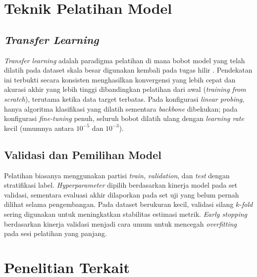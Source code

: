\section{Teknik Pelatihan Model}
\label{sec:training}

\subsection{\textit{Transfer Learning}}

\textit{Transfer learning} adalah paradigma pelatihan di mana bobot model yang telah dilatih pada dataset skala besar digunakan kembali pada tugas hilir \citep{dosovitskiyImageWorth16x162021}. Pendekatan ini terbukti secara konsisten menghasilkan konvergensi yang lebih cepat dan akurasi akhir yang lebih tinggi dibandingkan pelatihan dari awal (\textit{training from scratch}), terutama ketika data target terbatas. Pada konfigurasi \textit{linear probing}, hanya algoritma klasifikasi yang dilatih sementara \textit{backbone} dibekukan; pada konfigurasi \textit{fine-tuning} penuh, seluruh bobot dilatih ulang dengan \textit{learning rate} kecil (umumnya antara $10^{-5}$ dan $10^{-3}$).

\subsection{Validasi dan Pemilihan Model}

Pelatihan biasanya menggunakan partisi \textit{train}, \textit{validation}, dan \textit{test} dengan stratifikasi label. \textit{Hyperparameter} dipilih berdasarkan kinerja model pada set validasi, sementara evaluasi akhir dilaporkan pada set uji yang belum pernah dilihat selama pengembangan. Pada dataset berukuran kecil, validasi silang $k$-\textit{fold} sering digunakan untuk meningkatkan stabilitas estimasi metrik. \textit{Early stopping} berdasarkan kinerja validasi menjadi cara umum untuk mencegah \textit{overfitting} pada sesi pelatihan yang panjang.

\section{Penelitian Terkait}
\label{sec:penelitian-terkait}

